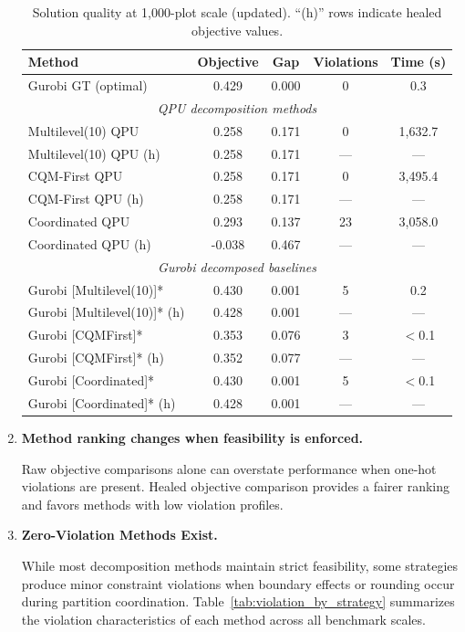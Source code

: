 \documentclass{oqireport}
\begin{document}
\begin{enumerate}[label=\textbf{Result \arabic*.}, leftmargin=*, align=left, itemsep=1em]
\begin{table}[H]
\centering
\caption{Solution quality at 1,000-plot scale (updated). ``(h)'' rows indicate healed objective values.}
\label{tab:quality_1000plots}
\small
\begin{tabular}{lcccc}
\toprule
\textbf{Method} & \textbf{Objective} & \textbf{Gap} & \textbf{Violations} & \textbf{Time (s)} \\
\midrule
Gurobi GT (optimal) & 0.429 & 0.000 & 0 & 0.3 \\
\midrule
\multicolumn{5}{c}{\textit{QPU decomposition methods}} \\
\midrule
Multilevel(10) QPU & 0.258 & 0.171 & 0 & 1,632.7 \\
Multilevel(10) QPU (h) & 0.258 & 0.171 & --- & --- \\
CQM-First QPU & 0.258 & 0.171 & 0 & 3,495.4 \\
CQM-First QPU (h) & 0.258 & 0.171 & --- & --- \\
Coordinated QPU & 0.293 & 0.137 & 23 & 3,058.0 \\
Coordinated QPU (h) & -0.038 & 0.467 & --- & --- \\
\midrule
\multicolumn{5}{c}{\textit{Gurobi decomposed baselines}} \\
\midrule
Gurobi [Multilevel(10)]* & 0.430 & 0.001 & 5 & 0.2 \\
Gurobi [Multilevel(10)]* (h) & 0.428 & 0.001 & --- & --- \\
Gurobi [CQMFirst]* & 0.353 & 0.076 & 3 & $<$0.1 \\
Gurobi [CQMFirst]* (h) & 0.352 & 0.077 & --- & --- \\
Gurobi [Coordinated]* & 0.430 & 0.001 & 5 & $<$0.1 \\
Gurobi [Coordinated]* (h) & 0.428 & 0.001 & --- & --- \\
\bottomrule
\end{tabular}
\end{table}

\item \textbf{Method ranking changes when feasibility is enforced.}

Raw objective comparisons alone can overstate performance when one-hot violations are present. Healed objective comparison provides a fairer ranking and favors methods with low violation profiles.

\item \textbf{Zero-Violation Methods Exist.}

While most decomposition methods maintain strict feasibility, some strategies produce minor constraint violations when boundary effects or rounding occur during partition coordination. Table~\ref{tab:violation_by_strategy} summarizes the violation characteristics of each method across all benchmark scales.


\end{enumerate}
\end{document}
